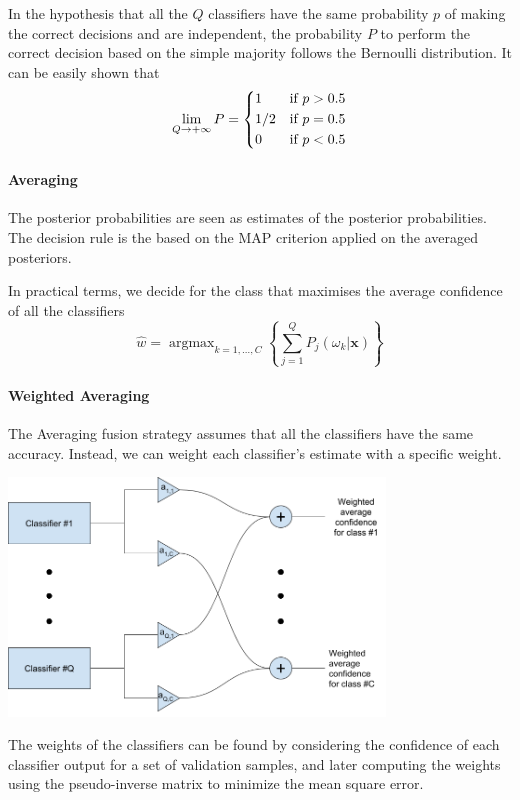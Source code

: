 \documentclass[oneside,onecolumn]{report}
\DeclareMathOperator*{\argmax}{argmax}
\begin{document}
In the hypothesis that all the $Q$ classifiers have the same probability $p$ of making the correct decisions and are independent, the probability $P$ to perform the correct decision based on the simple majority follows the Bernoulli distribution.
It can be easily shown that
$$ \lim_{Q \to +\infty} P = \begin{dcases}
    1 & \text{if } p > 0.5 \\
    1/2 & \text{if } p = 0.5 \\
    0 & \text{if } p < 0.5
\end{dcases} $$

\paragraph{Averaging}
The posterior probabilities are seen as estimates of the posterior probabilities.
The decision rule is the based on the MAP criterion applied on the averaged posteriors.

In practical terms, we decide for the class that maximises the average confidence of all the classifiers
$$ \widehat w = \argmax_{k = 1,\dots,C} \left\{ \sum_{j = 1}^Q P_j(\omega_k | \bm x) \right\} $$

\paragraph{Weighted Averaging}
The Averaging fusion strategy assumes that all the classifiers have the same accuracy.
Instead, we can weight each classifier's estimate with a specific weight.

\begin{center}
    \includegraphics[width=10cm]{weighted_averaging_fusion_strategy.png}
\end{center}

The weights of the classifiers can be found by considering the confidence of each classifier output for a set of validation samples, and later computing the weights using the pseudo-inverse matrix to minimize the mean square error.
\end{document}
